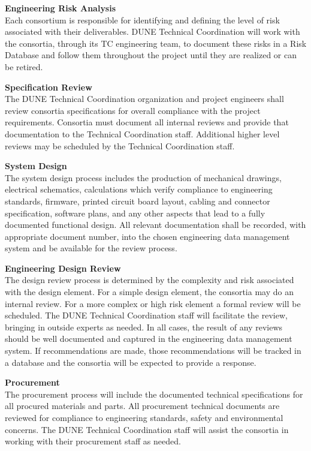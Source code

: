 {\bf Engineering Risk Analysis}\\
Each consortium is responsible for identifying and defining the level
of risk associated with their deliverables.  DUNE Technical
Coordination will work with the consortia, through its
TC engineering team, to document these risks in a Risk Database
and follow them throughout the project until they are realized or can
be retired.

{\bf Specification Review}\\
The DUNE Technical Coordination organization and project engineers
shall review consortia specifications for overall compliance with the
project requirements.  Consortia must document all internal reviews
and provide that documentation to the Technical Coordination staff.
Additional higher level reviews may be scheduled by the Technical
Coordination staff.

{\bf System Design}\\
The system design process includes the production of mechanical
drawings, electrical schematics, calculations which verify compliance
to engineering standards, firmware, printed circuit board layout,
cabling and connector specification, software plans, and any other
aspects that lead to a fully documented functional design.  All
relevant documentation shall be recorded, with appropriate document
number, into the chosen engineering data management system and be
available for the review process.

{\bf Engineering Design Review}\\
The design review process is determined by the complexity and risk
associated with the design element.  For a simple design element, the
consortia may do an internal review.  For a more complex or high risk
element a formal review will be scheduled.  The DUNE Technical
Coordination staff will facilitate the review, bringing in outside
experts as needed.  In all cases, the result of any reviews should be
well documented and captured in the engineering data management
system.  If recommendations are made, those recommendations will be
tracked in a database and the consortia will be expected to provide a
response.

{\bf Procurement}\\ The procurement process will include the
documented technical specifications for all procured materials and
parts.  All procurement technical documents are reviewed for
compliance to engineering standards, safety and environmental
concerns.  The DUNE Technical Coordination staff will assist the
consortia in working with their procurement staff as needed.

